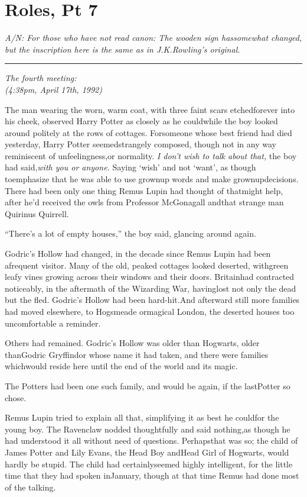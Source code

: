 \chapter{Roles, Pt 7}

\emph{A/N: For those who have not read canon: The wooden sign hassomewhat changed, but the inscription here is the same as in J.K.Rowling's original.}

\begin{center}\rule{3in}{0.4pt}\end{center}

\emph{The fourth meeting:\\ (4:38pm, April 17th, 1992)}

The man wearing the worn, warm coat, with three faint scars etchedforever into his cheek, observed Harry Potter as closely as he couldwhile the boy looked around politely at the rows of cottages. Forsomeone whose best friend had died yesterday, Harry Potter seemedstrangely composed, though not in any way reminiscent of unfeelingness,or normality. \emph{I don't wish to talk about that,} the boy had said,\emph{with you or anyone.} Saying `wish' and not `want', as though toemphasize that he was able to use grownup words and make grownupdecisions. There had been only one thing Remus Lupin had thought of thatmight help, after he'd received the owls from Professor McGonagall andthat strange man Quirinus Quirrell.

``There's a lot of empty houses,'' the boy said, glancing around again.

Godric's Hollow had changed, in the decade since Remus Lupin had been afrequent visitor. Many of the old, peaked cottages looked deserted, withgreen leafy vines growing across their windows and their doors. Britainhad contracted noticeably, in the aftermath of the Wizarding War, havinglost not only the dead but the fled. Godric's Hollow had been hard-hit.And afterward still more families had moved elsewhere, to Hogsmeade ormagical London, the deserted houses too uncomfortable a reminder.

Others had remained. Godric's Hollow was older than Hogwarts, older thanGodric Gryffindor whose name it had taken, and there were families whichwould reside here until the end of the world and its magic.

The Potters had been one such family, and would be again, if the lastPotter so chose.

Remus Lupin tried to explain all that, simplifying it as best he couldfor the young boy. The Ravenclaw nodded thoughtfully and said nothing,as though he had understood it all without need of questions. Perhapsthat was so; the child of James Potter and Lily Evans, the Head Boy andHead Girl of Hogwarts, would hardly be stupid. The child had certainlyseemed highly intelligent, for the little time that they had spoken inJanuary, though at that time Remus had done most of the talking.

